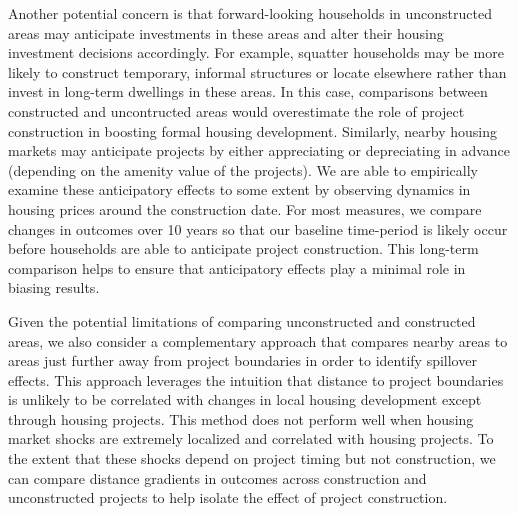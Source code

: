\documentclass[12pt]{article}
\begin{document}
Another potential concern is that forward-looking households in unconstructed areas may anticipate investments in these areas and alter their housing investment decisions accordingly.  For example, squatter households may be more likely to construct temporary, informal structures or locate elsewhere rather than invest in long-term dwellings in these areas.  In this case, comparisons between constructed and uncontructed areas would overestimate the role of project construction in boosting formal housing development.  Similarly, nearby housing markets may anticipate projects by either appreciating or depreciating in advance (depending on the amenity value of the projects).  We are able to empirically examine these anticipatory effects to some extent by observing dynamics in housing prices around the construction date.  For most measures, we compare changes in outcomes over 10 years so that our baseline time-period is likely occur before households are able to anticipate project construction.  This long-term comparison helps to ensure that anticipatory effects play a minimal role in biasing results.

Given the potential limitations of comparing unconstructed and constructed areas, we also consider a complementary approach that compares nearby areas to areas just further away from project boundaries in order to identify spillover effects.  This approach leverages the intuition that distance to project boundaries is unlikely to be correlated with changes in local housing development except through housing projects.  This method does not perform well when housing market shocks are extremely localized and correlated with housing projects.  To the extent that these shocks depend on project timing but not construction, we can compare distance gradients in outcomes across construction and unconstructed projects to help isolate the effect of project construction.  
\end{document}
